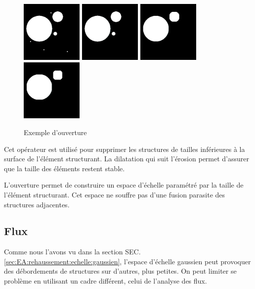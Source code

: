 \begin{figure}
  \centering
  \includegraphics[height=3cm]{Images/morpho_init.png}
  \includegraphics[height=3cm]{Images/morpho_open_k5.png}
  \includegraphics[height=3cm]{Images/morpho_open_k21.png}
  \includegraphics[height=3cm]{Images/morpho_open_k31.png}
  \label{fig:morpho_ouverture}
  \caption{Exemple d'ouverture}
\end{figure}

Cet opérateur est utilisé pour supprimer les structures de tailles inférieures à la surface de l'élément structurant. La dilatation qui suit l'érosion permet d'assurer que la taille des éléments restent stable.

L'ouverture permet de construire un espace d'échelle paramétré par la taille de l'élément structurant. Cet espace ne souffre pas d'une fusion parasite des structures adjacentes.

\subsection{Flux}
\label{sec:EA:rehaussement:echelle:flux}

Comme nous l'avons vu dans la section SEC. \ref{sec:EA:rehaussement:echelle:gaussien}, l'espace d'échelle gaussien peut provoquer des débordements de structures sur d'autres, plus petites. On peut limiter se problème en utilisant un cadre différent, celui de l'analyse des flux.

